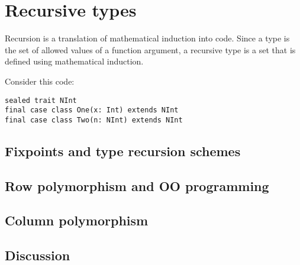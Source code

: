 
\chapter{Recursive types\label{chap:Recursive-types}}

Recursion is a translation of mathematical induction into code. Since
a type is the set of allowed values of a function argument, a recursive
type is a set that is defined using mathematical induction.

Consider this code:
\begin{lstlisting}
sealed trait NInt
final case class One(x: Int) extends NInt
final case class Two(n: NInt) extends NInt
\end{lstlisting}

\section{Fixpoints and type recursion schemes}

\section{Row polymorphism and OO programming}

\section{Column polymorphism}

\section{Discussion}

\begin{comment}
\end{comment}

